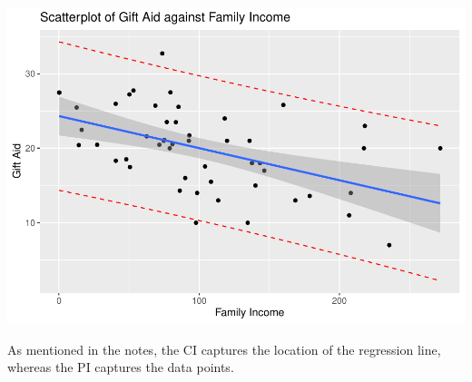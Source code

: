 \documentclass[
]{book}
\begin{document}
\includegraphics{bookdown-demo_files/figure-latex/unnamed-chunk-43-1.pdf}

As mentioned in the notes, the CI captures the location of the regression line, whereas the PI captures the data points.

  
\end{document}
